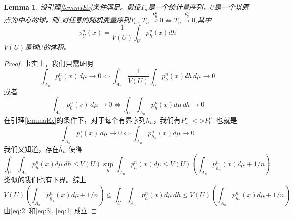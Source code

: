 \documentclass[review]{elsarticle}
\newtheorem{lemma}{Lemma}
\begin{document}
\begin{lemma}\label{lemmaContiguity}
    设引理\ref{lemmaEx}条件满足。假设$T_n$是一个统计量序列，$U$是一个以原点为中心的球。则
    对任意的随机变量序列$T_n$, $T_n\overset{P^n_0}{\rightsquigarrow}0\Leftrightarrow T_n\overset{P^n_U}{\rightsquigarrow}0$,其中
\begin{equation}
    p^n_U(x)=\frac{1}{V(U)}\int_{U}p_h^n(x)dh
\end{equation}
$V(U)$是球$U$的体积。
\end{lemma}

\begin{proof}
    事实上，我们只需证明
\begin{equation}
\int_{A_n}p_0^n(x)\, d\mu \to 0 \Leftrightarrow \int_{A_n}\frac{1}{V(U)}\int_U p_h^n(x) dh \, d\mu \to 0
\end{equation}
或者
\begin{equation}\label{eq:1}
\int_{A_n}p_0^n(x)\, d\mu \to 0 \Leftrightarrow \int_{U}\int_{A_n} p_h^n(x) d\mu \, dh \to 0
\end{equation}
在引理\ref{lemmaEx}的条件下，对于每个有界序列$h_n$，我们有$P_{h_n}^n\triangleleft \triangleright P_{0}^n$, 也就是
\begin{equation}\label{eq:2}
\int_{A_n}p_0^n(x)\, d\mu \to 0 \Leftrightarrow \int_{A_n} p_{h_n}^n(x) d\mu  \to 0
\end{equation}
我们又知道，存在$\overline{h}_n$ 使得
\begin{equation}
\int_{U}\int_{A_n} p_h^n(x) d\mu \, dh
\leq V(U)\sup_{h}\int_{A_n} p_h^n(x) d\mu
\leq V(U)(\int_{A_n}p^n_{\overline{h}_n}(x)d\mu +1/n)
\end{equation}
类似的我们也有下界。综上
\begin{equation}\label{eq:3}
 V(U)(\int_{A_n}p^n_{\underline{h}_n}(x)d\mu +1/n)
\leq \int_{U}\int_{A_n} p_h^n(x) d\mu \, dh
\leq V(U)(\int_{A_n}p^n_{\overline{h}_n}(x)d\mu +1/n)
\end{equation}
由\eqref{eq:2} 和\eqref{eq:3}, \eqref{eq:1} 成立
\end{proof}
\end{document}

